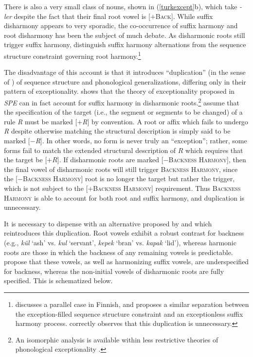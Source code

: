 \noindent
There is also a very small class of nouns, shown in (\ref{turkexcept}b), which take \emph{-ler} despite the fact that their final root vowel is [$+$\textsc{Back}]. While suffix disharmony appears to very sporadic, the co-occurrence of suffix harmony and root disharmony has been the subject of much debate. As disharmonic roots still trigger suffix harmony, 
\citet{Iverson1978} distinguish suffix harmony alternations from the sequence structure constraint governing root harmony.\footnote{\citet[29f.]{Kiparsky1968} discusses a parallel case in Finnish, and proposes a similar separation between the exception-filled sequence structure constraint and an exceptionless suffix harmony process. \citet[171f.]{Howard1972} correctly observes that this duplication is unnecessary.}

The disadvantage of this account is that it introduces ``duplication'' (in the sense of \citealt{Kisseberth1970b}) of sequence structure and phonological generalizations, differing only in their pattern of exceptionality. \citet[][197f.]{Zonneveld1978} shows that the theory of exceptionality proposed in \emph{SPE} can in fact account for suffix harmony in disharmonic roots.\footnote{An isomorphic analysis is available within less restrictive theories of phonological exceptionality \citep[e.g.,][]{Kisseberth1970,Pater2009}.} \citeauthor{SPE} assume that the specification of the target (i.e., the segment or segments to be changed) of a rule \emph{R} must be marked [$+$\emph{R}] by convention. A root or affix which fails to undergo \emph{R} despite otherwise matching the structural description is simply said to be marked [$-$\emph{R}]. In other words, no form is never truly an ``exception''; rather, some forms fail to match the extended structural description of $R$ which requires that the target be [$+R$]. If disharmonic roots are marked [$-$\textsc{Backness Harmony}], then the final vowel of disharmonic roots will still trigger \textsc{Backness Harmony}, since the [$-$\textsc{Backness Harmony}] root is no longer the target but rather the trigger, which is not subject to the [$+$\textsc{Backness Harmony}] requirement. Thus \textsc{Backness Harmony} is able to account for both root and suffix harmony, and duplication is unnecessary.

It is necessary to dispense with an alternative proposed by \citet{Clements1982} and \citet{Inkelas1997} which reintroduces this duplication. Root vowels exhibit a robust contrast for backness (e.g., \emph{kül} `ash' vs.  \emph{kul} `servant', \emph{kepek} `bran' vs. \emph{kapak} `lid'), whereas harmonic roots are those in which the backness of any remaining vowels is predictable. \citeauthor{Clements1982} propose that these vowels, as well as harmonizing suffix vowels, are underspecified for backness, whereas the non-initial vowels of disharmonic roots are fully specified. This is schematized below.


